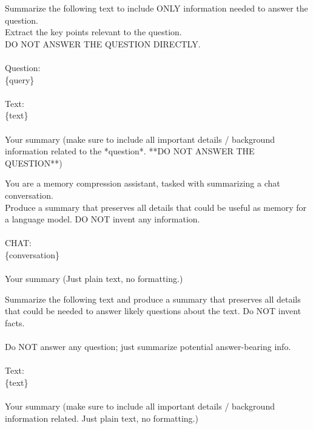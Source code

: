 \documentclass{article} %
\begin{document}
\begin{examplebox}
    \ttfamily
Summarize the following text to include ONLY information needed to answer the question.\\
Extract the key points relevant to the question.\\
DO NOT ANSWER THE QUESTION DIRECTLY.\\
\\
Question: \\
\{query\} \\
\\
Text: \\
\{text\}\\
\\
Your summary (make sure to include all important details / background information related to the *question*. **DO NOT ANSWER THE QUESTION**)
\end{examplebox}

\begin{examplebox}
    \ttfamily
You are a memory compression assistant, tasked with summarizing a chat conversation. \\
Produce a summary that preserves all details that could be useful as memory for a language model. DO NOT invent any information. \\
\\
CHAT: \\ 
\{conversation\}\\
\\
Your summary (Just plain text, no formatting.)
\end{examplebox}

\begin{examplebox}
    \ttfamily
Summarize the following text and produce a summary that preserves all details that could be needed to answer likely questions about the text. Do NOT invent facts.\\
\\
Do NOT answer any question; just summarize potential answer-bearing info. \\
\\
Text: \\
\{text\}\\
\\
Your summary (make sure to include all important details / background information related. Just plain text, no formatting.)
\end{examplebox}
\end{document}
